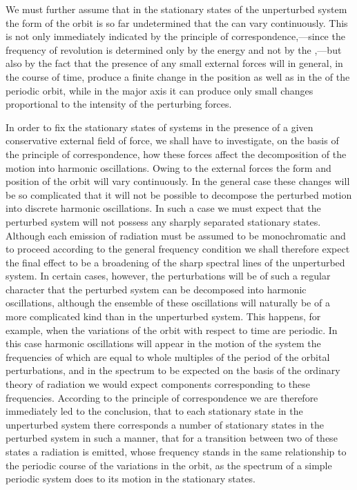 We must further assume that in the stationary states of the
unperturbed system the form of the orbit is so far undetermined
that the  can vary continuously. This is not only immediately
indicated by the principle of correspondence,---since the
frequency of revolution is determined only by the energy and not
by the ,---but also by the fact that the presence of any
small external forces will in general, in the course of time, produce
a finite change in the position as well as in the  of the
periodic orbit, while in the major axis it can produce only small
changes proportional to the intensity of the perturbing forces.

In order to fix the stationary states of systems in the presence
of a given conservative external field of force, we shall have to
investigate, on the basis of the principle of correspondence, how
these forces affect the decomposition of the motion into harmonic
oscillations. Owing to the external forces the form and position of
the orbit will vary continuously. In the general case these changes
will be so complicated that it will not be possible to decompose the
perturbed motion into discrete harmonic oscillations. In such a
case we must expect that the perturbed system will not possess
any sharply separated stationary states. Although each emission
of radiation must be assumed to be monochromatic and to proceed
according to the general frequency condition we shall therefore
expect the final effect to be a broadening of the sharp spectral lines
of the unperturbed system. In certain cases, however, the perturbations
will be of such a regular character that the perturbed system
can be decomposed into harmonic oscillations, although the ensemble
of these oscillations will naturally be of a more complicated kind
than in the unperturbed system. This happens, for example, when
the variations of the orbit with respect to time are periodic. In
this case harmonic oscillations will appear in the motion of the
system the frequencies of which are equal to whole multiples of the
period of the orbital perturbations, and in the spectrum to be
expected on the basis of the ordinary theory of radiation we would
expect components corresponding to these frequencies. According
to the principle of correspondence we are therefore immediately
led to the conclusion, that to each stationary state in the unperturbed
system there corresponds a number of stationary states in
the perturbed system in such a manner, that for a transition
between two of these states a radiation is emitted, whose frequency
stands in the same relationship to the periodic course of the
variations in the orbit, as the spectrum of a simple periodic system
does to its motion in the stationary states.

